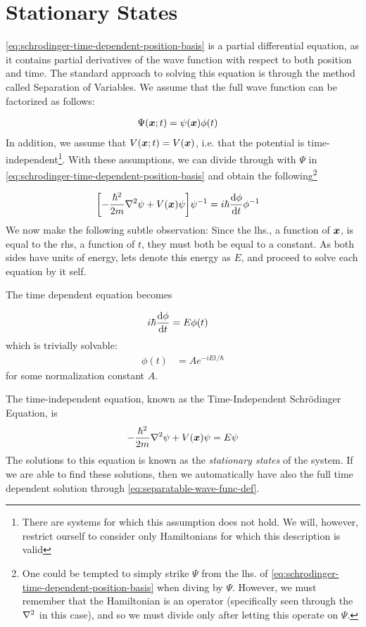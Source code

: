 \documentclass[Thesis.tex]{subfiles}
\begin{document}
\section{Stationary States}

\autoref{eq:schrodinger-time-dependent-position-basis} is a partial differential equation,
as it contains partial derivatives of the wave function with respect to both position and
time. The standard approach to solving this equation is through the method called
Separation of Variables. We assume that the full wave function can be factorized as
follows:

\begin{align}
    \Psi(\bm{x}; t) &= \psi(\bm{x})\phi(t)\label{eq:separatable-wave-func-def}
\end{align}
%
In addition, we assume that $V(\bm{x}; t) = V(\bm{x})$, i.e. that the potential is
time-independent\footnote{There are systems for which this assumption does not hold. We
will, however, restrict ourself to consider only Hamiltonians for which this description
is valid}. With these assumptions, we can divide through with $\Psi$ in
\autoref{eq:schrodinger-time-dependent-position-basis} and obtain the
following\footnote{One could be tempted to simply strike $\Psi$ from the lhs. of
\autoref{eq:schrodinger-time-dependent-position-basis} when diving by $\Psi$. However, we
must remember that the Hamiltonian is an operator (specifically seen through the
$\laplacian$ in this case), and so we must divide only after letting this operate on
$\Psi$.} 

\begin{align}
    \qty[- \frac{\hbar^2}{2m} \laplacian \psi + V(\vb x)\psi]\psi^{-1} &=
    i\hbar\dv{\phi}{t} \phi^{-1}
\end{align}
%
We now make the following subtle observation: Since the lhs., a function of $\bm{x}$, is
equal to the rhs, a function of $t$, they must both be equal to a constant. As both sides
have units of energy, lets denote this energy as $E$, and proceed to solve each equation
by it self.

The time dependent equation becomes

\begin{align}
    i\hbar \dv{\phi}{t} &= E\phi(t)
\end{align}
which is trivially solvable:
\begin{align}
    \phi(t) &= Ae^{-iEt/\hbar}
\end{align}
for some normalization constant $A$.

The time-independent equation, known as the Time-Independent Schrödinger Equation, is
\begin{align}
    - \frac{\hbar^2}{2m} \laplacian\psi + V(\vb x)\psi =
    E\psi\label{eq:schrodinger-time-independent-position-basis}
\end{align}
The solutions to this equation is known as the \emph{stationary states} of the system. If
we are able to find these solutions, then we automatically have also the full time
dependent solution through \autoref{eq:separatable-wave-func-def}.
\end{document}
